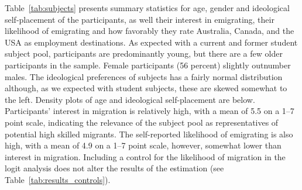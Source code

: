 \documentclass[12pt]{article}
\begin{document}
\begin{appendices}
\par Table~\ref{tab:subjects} presents summary statistics for age, gender and ideological self-placement of the participants, as well their interest in emigrating, their likelihood of emigrating and how favorably they rate Australia, Canada, and the USA as employment destinations. As expected with a current and former student subject pool, participants are predominantly young, but there are a few older participants in the sample. Female participants (56 percent) slightly outnumber males. The ideological preferences of subjects has a fairly normal distribution although, as we expected with student subjects, these are skewed somewhat to the left. Density plots of age and ideological self-placement are below. Participants' interest in migration is relatively high, with a mean of 5.5 on a 1--7 point scale, indicating the relevance of the subject pool as representatives of potential high skilled migrants. The self-reported likelihood of emigrating is also high, with a mean of 4.9 on a 1--7 point scale, however, somewhat lower than interest in migration. Including a control for the likelihood of migration in the logit analysis does not alter the results of the estimation (see Table~\ref{tab:results_controls}).


\end{appendices}
\end{document}
